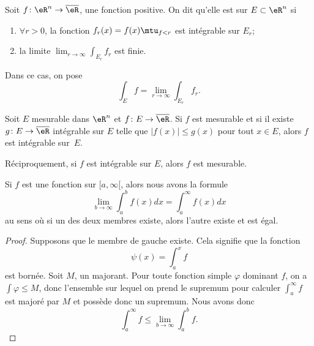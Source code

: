 Soit \( f\colon \eR^n\to \overline{ \eR }\), une fonction positive. On dit qu'elle est  sur \( E\subset\eR^n\) si
\begin{enumerate}
	\item \( \forall r>0\), la fonction \( f_r(x)=f(x)\mtu_{f<r}\) est intégrable sur \( E_r\);
	\item la limite \( \lim_{r\to\infty}\int_{E_r}f_r\) est finie.
\end{enumerate}
Dans ce cas, on pose
\begin{equation}
	\int_Ef=\lim_{r\to\infty}\int_{E_r}f_r.
\end{equation}

\begin{theorem}	\label{ThoFnTestIntnnBorn}
	Soit \( E\) mesurable dans \( \eR^n\) et \( f\colon E\to \overline{ \eR }\). Si \( f\) est mesurable et si il existe \( g\colon E\to \overline{ \eR }\) intégrable sur \( E\) telle que \( | f(x) |\leq g(x)\) pour tout \( x\in E\), alors \( f\) est intégrable sur~\( E\).

	Réciproquement, si \( f\) est intégrable sur \( E\), alors \( f\) est mesurable.
\end{theorem}

\begin{lemma}\label{LemTHBSEs}
	Si \( f\) est une fonction sur \( \mathopen[ a , \infty [\), alors nous avons la formule
	\begin{equation}
		\lim_{b\to \infty}\int_a^bf(x)dx=\int_a^{\infty}f(x)dx
	\end{equation}
	au sens où si un des deux membres existe, alors l'autre existe et est égal.
\end{lemma}

\begin{proof}
	Supposons que le membre de gauche existe. Cela signifie que la fonction
	\begin{equation}
		\psi(x)=\int_a^xf
	\end{equation}
	est bornée. Soit \( M\), un majorant. Pour toute fonction simple \( \varphi\) dominant \( f\), on a \( \int\varphi\leq M\), donc l'ensemble sur lequel on prend le supremum pour calculer \( \int_a^{\infty}f\) est majoré par \( M\) et possède donc un supremum. Nous avons donc
	\begin{equation}
		\int_a^{\infty}f\leq\lim_{b\to\infty}\int_a^bf.
	\end{equation}
\end{proof}


